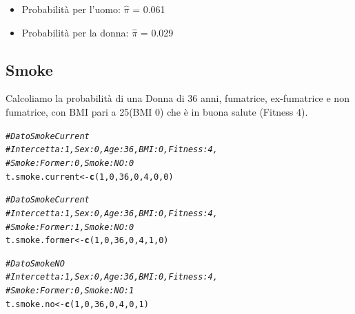 \documentclass{article}\usepackage[]{graphicx}\usepackage[]{xcolor}
\makeatletter
\newcommand{\hlnum}[1]{\textcolor[rgb]{0.686,0.059,0.569}{#1}}%
\newcommand{\hlcom}[1]{\textcolor[rgb]{0.678,0.584,0.686}{\textit{#1}}}%
\newcommand{\hlstd}[1]{\textcolor[rgb]{0.345,0.345,0.345}{#1}}%
\newcommand{\hlkwb}[1]{\textcolor[rgb]{0.69,0.353,0.396}{#1}}%
\newcommand{\hlkwd}[1]{\textcolor[rgb]{0.737,0.353,0.396}{\textbf{#1}}}%
\newenvironment{kframe}{%
 \def\at@end@of@kframe{}%
 \ifinner\ifhmode%
  \def\at@end@of@kframe{\end{minipage}}%
  \begin{minipage}{\columnwidth}%
 \fi\fi%
 \def\FrameCommand##1{\hskip\@totalleftmargin \hskip-\fboxsep
 \colorbox{shadecolor}{##1}\hskip-\fboxsep
     \hskip-\linewidth \hskip-\@totalleftmargin \hskip\columnwidth}%
 \MakeFramed {\advance\hsize-\width
   \@totalleftmargin\z@ \linewidth\hsize
   \@setminipage}}%
 {\par\unskip\endMakeFramed%
 \at@end@of@kframe}
\newenvironment{knitrout}{}{} %
\makeatother
\begin{document}
    \begin{itemize}
      \item Probabilità per l'uomo: $\hat{\pi}$ = 0.061
      \item Probabilità per la donna: $\hat{\pi}$ = 0.029
    \end{itemize}
    
  \subsection{Smoke}
    Calcoliamo la probabilità di una Donna di 36 anni, fumatrice, ex-fumatrice 
    e non fumatrice, con BMI pari a 25(BMI 0) che è in buona salute (Fitness 4).
      
\begin{knitrout}
\color{fgcolor}\begin{kframe}
\begin{alltt}
\hlcom{#Dato SmokeCurrent}
\hlcom{#Intercetta: 1, Sex:0, Age: 36, BMI: 0, Fitness: 4, }
\hlcom{#Smoke:Former: 0, Smoke:NO: 0 }
\hlstd{t.smoke.current} \hlkwb{<-} \hlkwd{c}\hlstd{(}\hlnum{1}\hlstd{,} \hlnum{0}\hlstd{,} \hlnum{36}\hlstd{,} \hlnum{0}\hlstd{,} \hlnum{4}\hlstd{,} \hlnum{0}\hlstd{,} \hlnum{0}\hlstd{)}

\hlcom{#Dato SmokeCurrent}
\hlcom{#Intercetta: 1, Sex:0, Age: 36, BMI: 0, Fitness: 4, }
\hlcom{#Smoke:Former: 1, Smoke:NO: 0 }
\hlstd{t.smoke.former} \hlkwb{<-} \hlkwd{c}\hlstd{(}\hlnum{1}\hlstd{,} \hlnum{0}\hlstd{,} \hlnum{36}\hlstd{,} \hlnum{0}\hlstd{,} \hlnum{4}\hlstd{,} \hlnum{1}\hlstd{,} \hlnum{0}\hlstd{)}

\hlcom{#Dato SmokeNO}
\hlcom{#Intercetta: 1, Sex:0, Age: 36, BMI: 0, Fitness: 4, }
\hlcom{#Smoke:Former: 0, Smoke:NO: 1 }
\hlstd{t.smoke.no} \hlkwb{<-} \hlkwd{c}\hlstd{(}\hlnum{1}\hlstd{,} \hlnum{0}\hlstd{,} \hlnum{36}\hlstd{,} \hlnum{0}\hlstd{,} \hlnum{4}\hlstd{,} \hlnum{0}\hlstd{,} \hlnum{1}\hlstd{)}
\end{alltt}
\end{kframe}
\end{knitrout}
    
\end{document}

